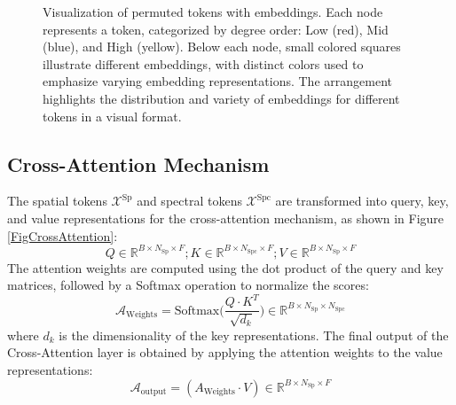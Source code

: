 \documentclass[journal]{IEEEtran}
\begin{document}
\begin{figure}[!hbt]
\caption{Visualization of permuted tokens with embeddings. Each node represents a token, categorized by degree order: Low (red), Mid (blue), and High (yellow). Below each node, small colored squares illustrate different embeddings, with distinct colors used to emphasize varying embedding representations. The arrangement highlights the distribution and variety of embeddings for different tokens in a visual format.}
\label{Graph}
\end{figure}

\subsection{Cross-Attention Mechanism}
The spatial tokens $\mathcal{X}^{\text{Sp}}$ and spectral tokens $\mathcal{X}^{\text{Spc}}$ are transformed into query, key, and value representations for the cross-attention mechanism, as shown in Figure \ref{FigCrossAttention}:
\begin{equation}
    Q \in \mathbb{R}^{B \times N_{\text{Sp}} \times F} ; K \in \mathbb{R}^{B \times N_{\text{Spc}} \times F} ; V \in \mathbb{R}^{B \times N_{\text{Sp}} \times F}
\end{equation}
The attention weights are computed using the dot product of the query and key matrices, followed by a Softmax operation to normalize the scores:
\begin{equation}
    \mathcal{A}_{\text{Weights}} = \text{Softmax} \bigg(\frac{Q \cdot K^T}{\sqrt{d_k}}\bigg) \in \mathbb{R}^{B \times N_{\text{Sp}} \times N_{\text{Spc}}}
\end{equation}
where $d_k$ is the dimensionality of the key representations. The final output of the Cross-Attention layer is obtained by applying the attention weights to the value representations:
\begin{equation}
    \mathcal{A}_{\text{output}} = (A_{\text{Weights}} \cdot V) \in \mathbb{R}^{B \times N_{\text{Sp}} \times F}
\end{equation}
\end{document}
